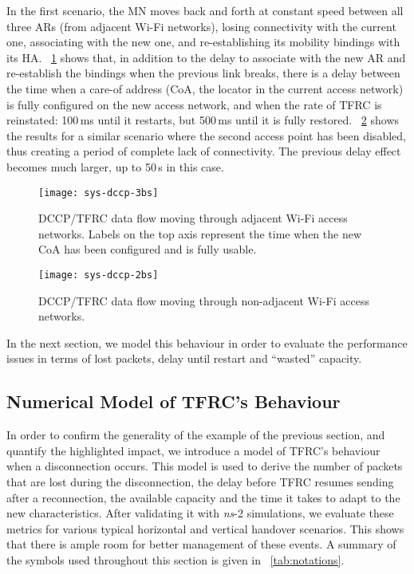 \documentclass[twocolumn]{nictatechreport}
\newcommand{\ns}{\textit{ns}}
\begin{document}
In the first scenario, the MN moves back and forth at constant speed between all
three ARs (from adjacent Wi-Fi networks), losing connectivity with the current
one, associating with the new one, and re-establishing its mobility bindings
with its HA. \figurename~\ref{fig:sys-dccp-3bs} shows that, in addition to the
delay to associate with the new AR and re-establish the bindings when the
previous link breaks, there is a delay between the time when a care-of address
(CoA, the locator in the current access network) is fully configured on the new
access network, and when the rate of TFRC is reinstated: 100\,ms until it
restarts, but 500\,ms until it is fully restored.
\figurename~\ref{fig:sys-dccp-2bs} shows the results for a similar scenario
where the second access point has been disabled, thus creating a period of
complete lack of connectivity.  The previous delay effect becomes much larger,
up to 50\,s in this case.

\begin{figure}[tb]
  \centering
  \texttt{[image: sys-dccp-3bs]}

  \caption[DCCP/TFRC data flow moving through adjacent Wi-Fi access
  networks]{DCCP/TFRC data flow moving through adjacent Wi-Fi access
  networks. Labels on the top axis represent the time when the new CoA has
  been configured and is fully usable.}
  
  \label{fig:sys-dccp-3bs}

\end{figure}

\begin{figure}[tb]
  \centering
  \texttt{[image: sys-dccp-2bs]}

  \caption[DCCP/TFRC data flow moving through non-adjacent Wi-Fi access
  networks]{DCCP/TFRC data flow moving through non-adjacent Wi-Fi access
  networks.}

  \label{fig:sys-dccp-2bs}
\end{figure}

In the next section, we model this behaviour in order to evaluate the performance
issues in terms of lost packets, delay until restart and ``wasted'' capacity.



\subsection{Numerical Model of TFRC's Behaviour}
\label{sec:model}

In order to confirm the generality of the example of the previous section, and
quantify the highlighted impact, we
introduce a model of TFRC's behaviour when a disconnection occurs. This model is
used to derive the number of packets that are lost during the disconnection, the
delay before TFRC resumes sending after a reconnection, the available capacity
and the time it takes to adapt to the new characteristics. After validating it
with \ns-2 simulations, we evaluate these metrics for various typical horizontal
and vertical handover scenarios. This shows that there is ample room for better
management of these events. A summary of the symbols used throughout this
section is given in \tablename~\ref{tab:notations}.
\end{document}
